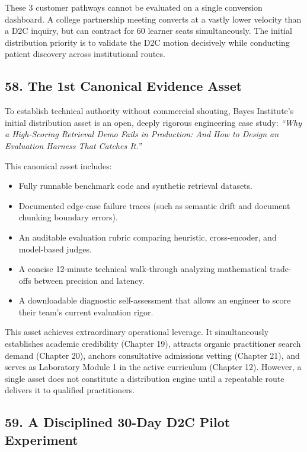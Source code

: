These 3 customer pathways cannot be evaluated on a single conversion dashboard. A college partnership meeting converts at a vastly lower velocity than a D2C inquiry, but can contract for 60 learner seats simultaneously. The initial distribution priority is to validate the D2C motion decisively while conducting patient discovery across institutional routes.

\subsection*{58. The 1st Canonical Evidence Asset}

To establish technical authority without commercial shouting, Bayes Institute's initial distribution asset is an open, deeply rigorous engineering case study: \textit{``Why a High-Scoring Retrieval Demo Fails in Production: And How to Design an Evaluation Harness That Catches It.''}

This canonical asset includes:
\begin{itemize}[leftmargin=*,itemsep=1pt]
  \item Fully runnable benchmark code and synthetic retrieval datasets.
  \item Documented edge-case failure traces (such as semantic drift and document chunking boundary errors).
  \item An auditable evaluation rubric comparing heuristic, cross-encoder, and model-based judges.
  \item A concise 12-minute technical walk-through analyzing mathematical trade-offs between precision and latency.
  \item A downloadable diagnostic self-assessment that allows an engineer to score their team's current evaluation rigor.
\end{itemize}

This asset achieves extraordinary operational leverage. It simultaneously establishes academic credibility (Chapter 19), attracts organic practitioner search demand (Chapter 20), anchors consultative admissions vetting (Chapter 21), and serves as Laboratory Module 1 in the active curriculum (Chapter 12). However, a single asset does not constitute a distribution engine until a repeatable route delivers it to qualified practitioners.

\subsection*{59. A Disciplined 30-Day D2C Pilot Experiment}

